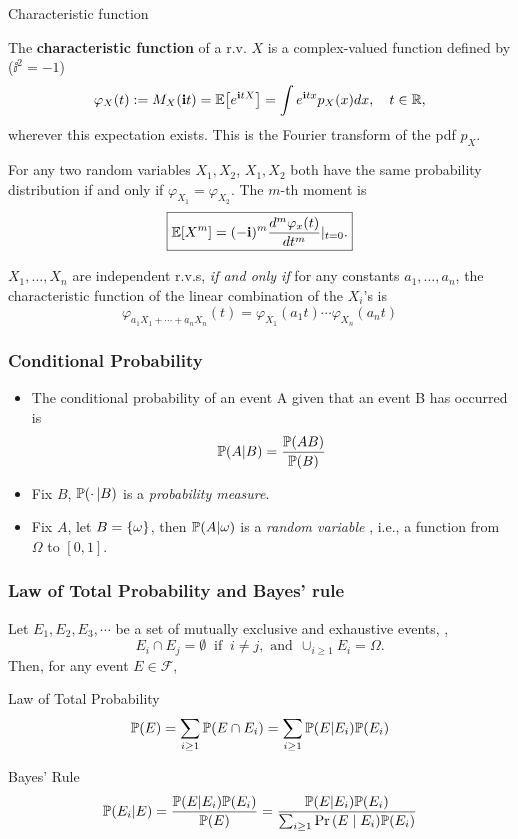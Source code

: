 \documentclass[english,10pt,handout]{beamer}
\begin{document}
\begin{frame}
{Characteristic function}
\biz
\item 
The {\bf characteristic  function } of a r.v. $X$ is  a complex-valued function defined by 
($\ii^2 =-1$)
\[
{\displaystyle \varphi_{X}(t):=M_X(\mathbf{i} t) = \operatorname{\mathbb E} \!\left[e^{\mathbf{i} tX}\right] = \int e^{\mathbf{i} t x}p_X(x)dx,\quad t\in {\mathbb{R}} ,} 
\]
wherever this expectation exists. This is the Fourier transform of the pdf $p_X$.
 \item 
 For any two random variables $X_1, X_2$,
$X_1, X_2$ both have the same probability distribution if and only if ${\displaystyle \varphi _{X_{1}}=\varphi _{X_{2}}}$.
The $m$-th moment is 
\[\boxed{ \operatorname{\mathbb E} [X^m] =(-\mathbf{i})^m \frac{d^m 
\varphi_x (t) }{d t^m}\vert_{t=0}.}\]

\item 
 $X_1,\ldots, X_n$ are independent r.v.s,
 {\it if and only if} for  any constants $a_1, \ldots, a_n$,  the characteristic function of the linear combination of the $X_i $'s is
\[
{\displaystyle \varphi _{a_{1}X_{1}+\cdots +a_{n}X_{n}}(t)=\varphi _{X_{1}}(a_{1}t)\cdots \varphi _{X_{n}}(a_{n}t)} \]
\eiz

\end{frame}


%

\begin{frame}
\frametitle{Conditional Probability}
\begin{itemize}[<+->]
\item The conditional probability of an event 
A given that an event B has occurred is
\[\mathbb{P}(A|B ) =\frac{\mathbb{P}(AB)}{\mathbb{P}(B)}\]

\item  Fix $B$, $\mathbb{P}(\cdot\, | B)$ is a {\it probability measure}.
\item  Fix $A$, let $B=\left\{\omega\right\}$, then $\mathbb{P}(A|\omega)$ is a {\it random variable} , i.e., a function from $\Omega$  to $[0,1]$.

\end{itemize}
\end{frame}


\begin{frame}
\frametitle{Law of Total Probability and Bayes' rule}

Let $E_1,E_2, E_3, \cdots$ be a set of mutually exclusive and exhaustive events, \ie, 
$$E_i\cap E_j =\emptyset   ~\text{  if } ~  i\neq j,    \mbox{ and}  ~~\cup_{i\geq 1} E_i = \Omega.$$
 Then, for any event $E\in\mathcal{F}$,

 \begin{block}
{Law of Total Probability}
\[\mathbb{P}(E)= \sum_{i\geq 1} \mathbb{P}(E\cap E_i)=\sum_{i\geq 1} \mathbb{P}(E|E_i) \mathbb{P}(E_i)\]
\end{block}
\pause
\begin{block}
{Bayes' Rule}
\[\mathbb{P}(E_i|E)= \frac{ \mathbb{P}(E|E_i) \mathbb{P}(E_i) } {\mathbb{P}(E)} = 
\frac{ \mathbb{P}(E|E_i) \mathbb{P}(E_i) } {\sum_{i\geq 1} {\Pr\left(E\mid E_i\right)} \mathbb{P}(E_i)}
\]
\end{block}
\end{frame}
\end{document}
